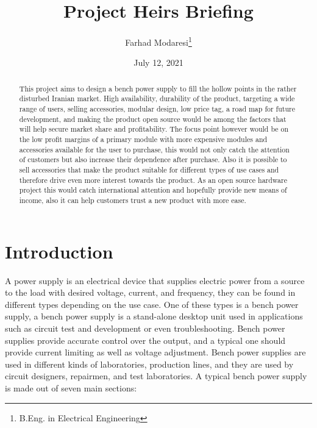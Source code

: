 \documentclass[a4paper, twocolumn]{article}
\title{
	\LARGE{
		\textbf{
			Project Heirs Briefing
		}
	}
}
\author{
	Farhad Modaresi\footnote{B.Eng. in Electrical Engineering}
}
\date{July 12, 2021}
\begin{document}
\maketitle


\begin{abstract}
	This project aims to design a bench power supply to fill the hollow points in the rather disturbed Iranian market. High availability, durability of the product, targeting a wide range of users, selling accessories, modular design, low price tag, a road map for future development, and making the product open source would be among the factors that will help secure market share and profitability. The focus point however would be on the low profit margins of a primary module with more expensive modules and accessories available for the user to purchase, this would not only catch the attention of customers but also increase their dependence after purchase. Also it is possible to sell accessories that make the product suitable for different types of use cases and therefore drive even more interest towards the product. As an open source hardware project this would catch international attention and hopefully provide new means of income, also it can help customers trust a new product with more ease.
\end{abstract}
\section*{Introduction}
	A power supply is an electrical device that supplies electric power from a source to the load with desired voltage, current, and frequency, they can be found in different types depending on the use case. One of these types is a bench power supply, a bench power supply is a stand-alone desktop unit used in applications such as circuit test and development or even troubleshooting. Bench power supplies provide accurate control over the output, and a typical one should provide current limiting as well as voltage adjustment. Bench power supplies are used in different kinds of laboratories, production lines, and they are used by circuit designers, repairmen, and test laboratories. A typical bench power supply is made out of seven main sections:
\end{document}
